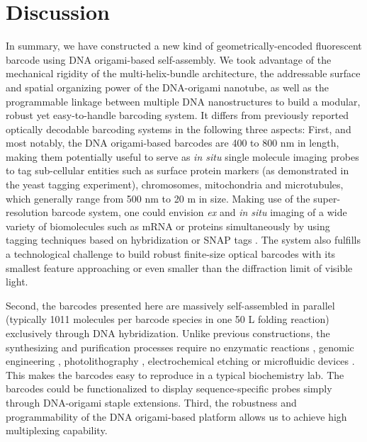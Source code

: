\section{Discussion}
In summary, we have constructed a new kind of geometrically-encoded 
fluorescent barcode using DNA origami-based self-assembly. We took advantage of the 
mechanical rigidity of the multi-helix-bundle architecture, the addressable surface and 
spatial organizing power of the DNA-origami nanotube, as well as the programmable 
linkage between multiple DNA nanostructures to build a modular, robust yet easy-to-handle barcoding system. It differs from previously reported optically decodable 
barcoding systems in the following three aspects: First, and most notably, the DNA origami-based barcodes are 400 to 800 nm in length, making them potentially useful to 
serve as \textit{in situ} single molecule imaging probes to tag sub-cellular entities such as surface 
protein markers (as demonstrated in the yeast tagging experiment), chromosomes, 
mitochondria and microtubules, which generally range from 500 nm to 20 \textmu m in size. 
Making use of the super-resolution barcode system, one could envision \textit{ex} and \textit{in situ} 
imaging of a wide variety of biomolecules such as mRNA or proteins simultaneously by 
using tagging techniques based on hybridization or SNAP tags \citep{gautier_engineered_2008,jones_fast_2011,keppler_general_2003,klein_live-cell_2011}. The system also 
fulfills a technological challenge to build robust finite-size optical barcodes with its 
smallest feature approaching or even smaller than the diffraction limit of visible light. 

Second, the barcodes presented here are massively self-assembled in parallel (typically 
1011 molecules per barcode species in one 50 \textmu L folding reaction) exclusively through 
DNA hybridization. Unlike previous constructions, the synthesizing and purification 
processes require no enzymatic reactions \citep{geiss_direct_2008}, genomic engineering \citep{livet_transgenic_2007}, photolithography \citep{pregibon_multifunctional_2007}, 
electrochemical etching \citep{cunin_biomolecular_2002} or microfluidic devices \citep{fournier-bidoz_facile_2008, pregibon_multifunctional_2007}. This makes the barcodes easy to 
reproduce in a typical biochemistry lab. The barcodes could be functionalized to display 
sequence-specific probes simply through DNA-origami staple extensions. Third, the 
robustness and programmability of the DNA origami-based platform allows us to achieve 
high multiplexing capability. 


